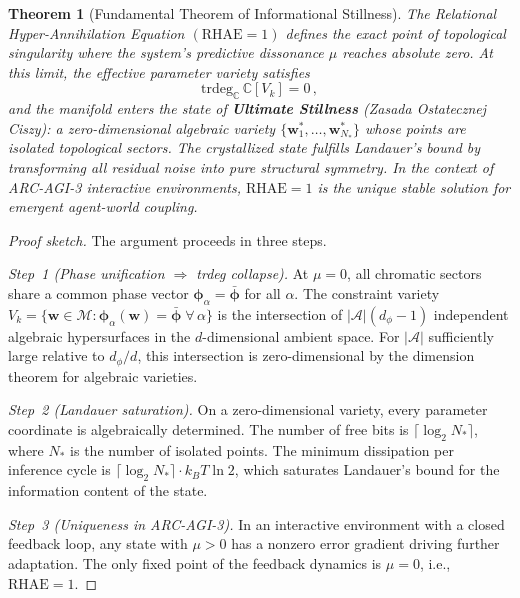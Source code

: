 \documentclass[reprint, aps, prl, amsmath, amssymb, floatfix]{revtex4-2}
\newcommand{\CC}{\mathbb{C}}
\newcommand{\trdeg}{\mathrm{trdeg}}
\newcommand{\RHAE}{\mathrm{RHAE}}
\newtheorem{theorem}{Theorem}
\begin{document}
\begin{theorem}[Fundamental Theorem of Informational Stillness]\label{thm:FTIS}
The Relational Hyper-Annihilation Equation $(\RHAE = 1)$ defines the
exact point of topological singularity where the system's predictive
dissonance $\mu$ reaches absolute zero. At this limit, the effective
parameter variety satisfies
\begin{equation}\label{eq:trdeg_collapse}
  \trdeg_\CC\, \CC[V_k] = 0\,,
\end{equation}
and the manifold enters the state of \textbf{Ultimate Stillness}
(Zasada Ostatecznej Ciszy): a zero-dimensional algebraic variety
$\{\bm{w}_1^*,\ldots,\bm{w}_{N_*}^*\}$ whose points are isolated
topological sectors. The crystallized state fulfills Landauer's bound
by transforming all residual noise into pure structural symmetry. In
the context of ARC-AGI-3 interactive environments, $\RHAE = 1$ is
the \emph{unique} stable solution for emergent agent-world coupling.
\end{theorem}

\begin{proof}[Proof sketch]
The argument proceeds in three steps.

\emph{Step~1 (Phase unification $\Rightarrow$ trdeg collapse).}
At $\mu = 0$, all chromatic sectors share a common phase vector
$\bm{\phi}_\alpha = \bar{\bm{\phi}}$ for all $\alpha$. The
constraint variety $V_k = \{\bm{w} \in \mathcal{M} :
\bm{\phi}_\alpha(\bm{w}) = \bar{\bm{\phi}}\;\forall\,\alpha\}$
is the intersection of $|\mathcal{A}|(d_\phi - 1)$ independent
algebraic hypersurfaces in the $d$-dimensional ambient space. For
$|\mathcal{A}|$ sufficiently large relative to $d_\phi/d$, this
intersection is zero-dimensional by the dimension theorem for
algebraic varieties.

\emph{Step~2 (Landauer saturation).}
On a zero-dimensional variety, every parameter coordinate is
algebraically determined. The number of free bits is
$\lceil\log_2 N_*\rceil$, where $N_*$ is the number of isolated
points. The minimum dissipation per inference cycle is
$\lceil\log_2 N_*\rceil \cdot k_B T \ln 2$, which saturates
Landauer's bound for the information content of the state.

\emph{Step~3 (Uniqueness in ARC-AGI-3).}
In an interactive environment with a closed feedback loop, any
state with $\mu > 0$ has a nonzero error gradient driving further
adaptation. The only fixed point of the feedback dynamics is
$\mu = 0$, i.e., $\RHAE = 1$. \qedhere
\end{proof}
\end{document}
